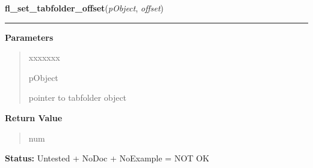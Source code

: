 \hspace{.8\funcindent}\begin{boxedminipage}{\funcwidth}

    \raggedright \textbf{fl\_set\_tabfolder\_offset}(\textit{pObject}, \textit{offset})

    \vspace{-1.5ex}

    \rule{\textwidth}{0.5\fboxrule}
\setlength{\parskip}{2ex}
\setlength{\parskip}{1ex}
      \textbf{Parameters}
      \vspace{-1ex}

      \begin{quote}
        \begin{Ventry}{xxxxxxx}

          \item[pObject]

          pointer to tabfolder object

        \end{Ventry}

      \end{quote}

      \textbf{Return Value}
    \vspace{-1ex}

      \begin{quote}
      num

      \end{quote}

\textbf{Status:} Untested + NoDoc + NoExample = NOT OK



    \end{boxedminipage}

    \label{xformslib:library:fl_add_text}

    \vspace{0.5ex}

